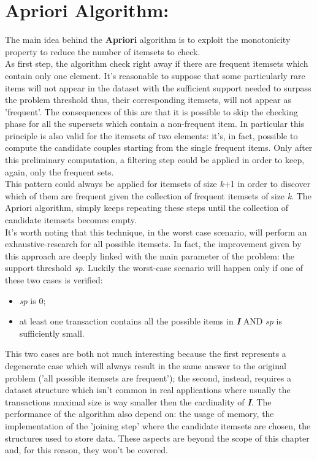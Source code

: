 \documentclass[]{report}
\begin{document}
\section*{Apriori Algorithm:}

	The main idea behind the \textbf{Apriori} algorithm is to exploit the monotonicity property to reduce the number of itemsets to check. \\ As first step, the algorithm check right away if there are frequent itemsets which contain only one element. It's reasonable to suppose that some particularly rare items will not appear in the dataset with the sufficient support needed to surpass the problem threshold thus, their corresponding itemsets, will not appear as 'frequent'. The consequences of this are that it is possible to skip the checking phase for all the supersets which contain a non-frequent item. In particular this principle is also valid for the itemsets of two elements: it's, in fact, possible to compute the candidate couples starting from the single frequent items. Only after this preliminary computation, a filtering step could be applied in order to keep, again, only the frequent sets. \\
	This pattern could always be applied for itemsets of size \textit{k}+1 in order to discover which of them are frequent given the collection of frequent itemsets of size \textit{k}. The Apriori algorithm, simply keeps repeating these steps until the collection of candidate itemsets becomes empty. \\
	It's worth noting that this technique, in the worst case scenario, will perform an exhaustive-research for all possible itemsets. In fact, the improvement given by this approach are deeply linked with the main parameter of the problem: the support threshold \textit{sp}. Luckily the worst-case scenario will happen only if one of these two cases is verified:
	\begin{itemize}
		\item \textit{sp} is 0;
		\item at least one transaction contains all the possible items in \textbf{\textit{I}} AND \textit{sp} is sufficiently small. 
	\end{itemize}     
	This two cases are both not much interesting because the first represents a degenerate case which will always result in the same answer to the original problem ('all possible itemsets are frequent'); the second, instead, requires a dataset structure which isn't common in real applications where usually the transactions maximal size is way smaller then the cardinality of \textbf{\textit{I}}.     
	The performance of the algorithm also depend on: the usage of memory, the implementation of the 'joining step' where the candidate itemsets are chosen, the structures used to store data. These aspects are beyond the scope of this chapter and, for this reason, they won't be covered.
	
\end{document}
